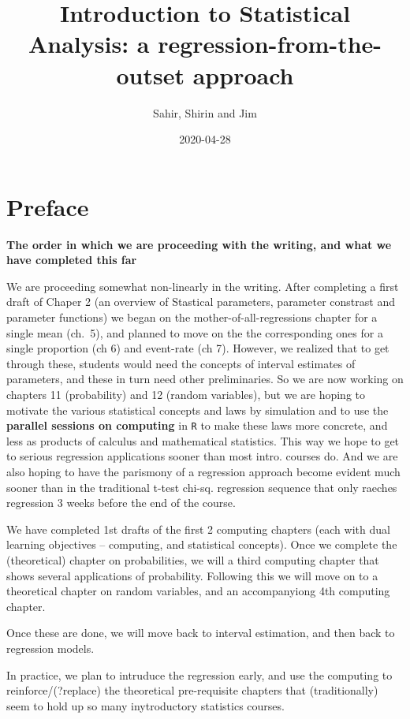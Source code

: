 \documentclass[]{book}
\title{Introduction to Statistical Analysis: a regression-from-the-outset approach}
\author{Sahir, Shirin and Jim}
\date{2020-04-28}
\begin{document}
\maketitle

{
\setcounter{tocdepth}{1}
\tableofcontents
}
\hypertarget{preface}{%
\chapter*{Preface}\label{preface}}

\textbf{The order in which we are proceeding with the writing, and what we have completed this far}

We are proceeding somewhat non-linearly in the writing. After completing a first draft of Chaper 2 (an overview of Stastical parameters, parameter constrast and parameter functions) we began on the mother-of-all-regressions chapter for a single mean (ch.~5), and planned to move on the the corresponding ones for a single proportion (ch 6) and event-rate (ch 7). However, we realized that to get through these, students would need the concepts of interval estimates of parameters, and these in turn need other preliminaries. So we are now working on chapters 11 (probability) and 12 (random variables), but we are hoping to motivate the various statistical concepts and laws by simulation and to use the \textbf{parallel sessions on computing} in \texttt{R} to make these laws more concrete, and less as products of calculus and mathematical statistics. This way we hope to get to serious regression applications sooner than most intro. courses do. And we are also hoping to have the parismony of a regression approach become evident much sooner than in the traditional t-test chi-sq. regression sequence that only raeches regression 3 weeks before the end of the course.

We have completed 1st drafts of the first 2 computing chapters (each with dual learning objectives -- computing, and statistical concepts). Once we complete the (theoretical) chapter on probabilities, we will a third computing chapter that shows several applications of probability. Following this we will move on to a theoretical chapter on random variables, and an accompanyiong 4th computing chapter.

Once these are done, we will move back to interval estimation, and then back to regression models.

In practice, we plan to intruduce the regression early, and use the computing to reinforce/(?replace) the theoretical pre-requisite chapters that (traditionally) seem to hold up so many inytroductory statistics courses.
\end{document}
